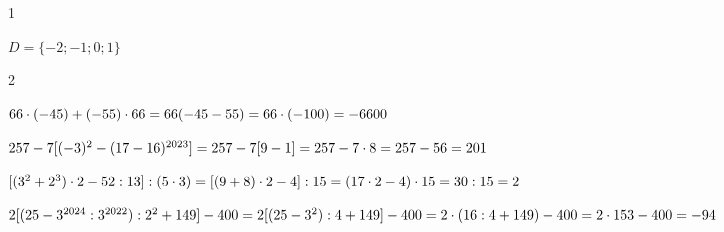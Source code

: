 \begin{Solbook}{1}
 \par \noindent $D=\{-2;-1;0;1\}$ \hfill \qedEX 
\end{Solbook}
\begin{Solbook}{2}
 \par \noindent  \begin {listEX}[2] \item $66\cdot (-45)+(-55)\cdot 66\\ =66(-45-55)\\ =66\cdot (-100) =-6600$ \item $257-7[(-3)^2-(17-16)^{2023}]\\=257-7[9-1]\\=257-7\cdot 8=257-56=201$ \item $[(3^2+2^3)\cdot 2-52:13]:(5\cdot 3)\\=[(9+8)\cdot 2-4]:15\\=(17\cdot 2-4)\cdot 15\\=30:15\\=2$ \item $2[(25-3^{2024}:3^{2022}):2^2+149]-400\\=2[(25-3^2):4+149]-400\\=2\cdot (16:4+149)-400\\=2\cdot 153-400=-94$ \end {listEX}  \hfill \qedEX 
\end{Solbook}
